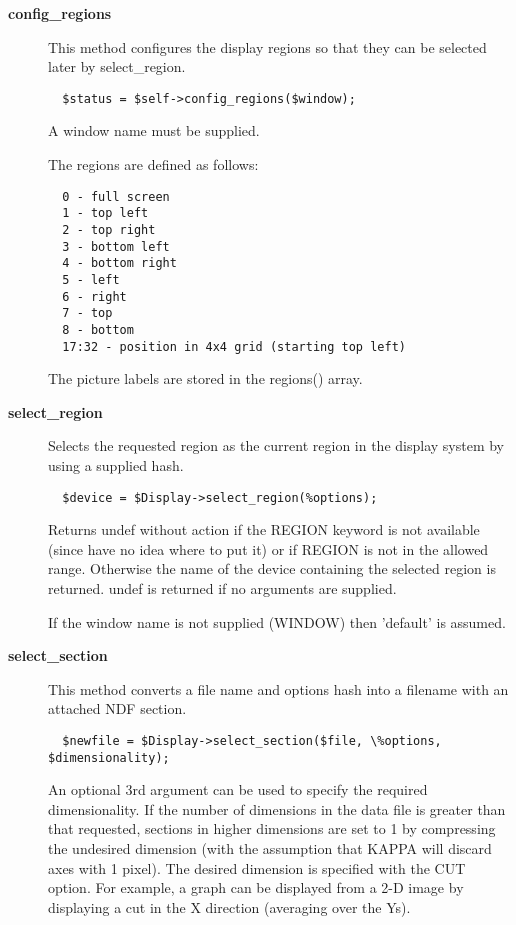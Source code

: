 \begin{description}
\item[\textbf{config\_regions}] \mbox{}

This method configures the display regions so that they can be
selected later by select\_region.

\begin{verbatim}
  $status = $self->config_regions($window);
\end{verbatim}


A window name must be supplied.



The regions are defined as follows:

\begin{verbatim}
  0 - full screen
  1 - top left
  2 - top right
  3 - bottom left
  4 - bottom right
  5 - left
  6 - right
  7 - top
  8 - bottom
  17:32 - position in 4x4 grid (starting top left)
\end{verbatim}


The picture labels are stored in the regions() array.

\item[\textbf{select\_region}] \mbox{}

Selects the requested region as the current region in the display
system by using a supplied hash.

\begin{verbatim}
  $device = $Display->select_region(%options);
\end{verbatim}


Returns undef without action if the REGION keyword is not available
(since have no idea where to put it) or if REGION is not in the
allowed range.  Otherwise the name of the device containing the selected
region is returned. undef is returned if no arguments are supplied.



If the window name is not supplied (WINDOW) then 'default' is assumed.

\item[\textbf{select\_section}] \mbox{}

This method converts a file name and options hash into
a filename with an attached NDF section.

\begin{verbatim}
  $newfile = $Display->select_section($file, \%options, $dimensionality);
\end{verbatim}


An optional 3rd argument can be used to specify the required 
dimensionality. If the number of dimensions in the data file is
greater than that requested, sections in higher dimensions
are set to 1 by compressing the undesired dimension
(with the assumption that KAPPA will discard axes
with 1 pixel). The desired dimension is specified with the CUT
option. For example, a graph can be displayed from a 2-D image
by displaying a cut in the X direction (averaging over the Ys).




\end{description}
